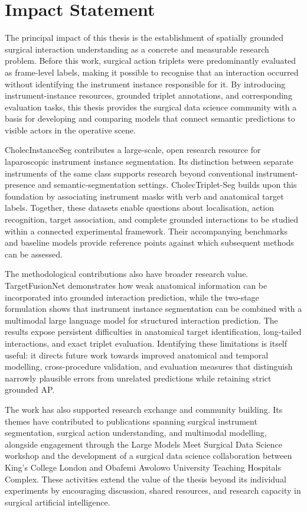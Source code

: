 \section{Impact Statement}
\label{sec:discussion-impact}

The principal impact of this thesis is the establishment of spatially grounded surgical interaction understanding as a concrete and measurable research problem. Before this work, surgical action triplets were predominantly evaluated as frame-level labels, making it possible to recognise that an interaction occurred without identifying the instrument instance responsible for it. By introducing instrument-instance resources, grounded triplet annotations, and corresponding evaluation tasks, this thesis provides the surgical data science community with a basis for developing and comparing models that connect semantic predictions to visible actors in the operative scene.

CholecInstanceSeg contributes a large-scale, open research resource for laparoscopic instrument instance segmentation. Its distinction between separate instruments of the same class supports research beyond conventional instrument-presence and semantic-segmentation settings. CholecTriplet-Seg builds upon this foundation by associating instrument masks with verb and anatomical target labels. Together, these datasets enable questions about localisation, action recognition, target association, and complete grounded interactions to be studied within a connected experimental framework. Their accompanying benchmarks and baseline models provide reference points against which subsequent methods can be assessed.

The methodological contributions also have broader research value. TargetFusionNet demonstrates how weak anatomical information can be incorporated into grounded interaction prediction, while the two-stage formulation shows that instrument instance segmentation can be combined with a multimodal large language model for structured interaction prediction. The results expose persistent difficulties in anatomical target identification, long-tailed interactions, and exact triplet evaluation. Identifying these limitations is itself useful: it directs future work towards improved anatomical and temporal modelling, cross-procedure validation, and evaluation measures that distinguish narrowly plausible errors from unrelated predictions while retaining strict grounded AP.

The work has also supported research exchange and community building. Its themes have contributed to publications spanning surgical instrument segmentation, surgical action understanding, and multimodal modelling, alongside engagement through the Large Models Meet Surgical Data Science workshop and the development of a surgical data science collaboration between King's College London and Obafemi Awolowo University Teaching Hospitals Complex. These activities extend the value of the thesis beyond its individual experiments by encouraging discussion, shared resources, and research capacity in surgical artificial intelligence.

